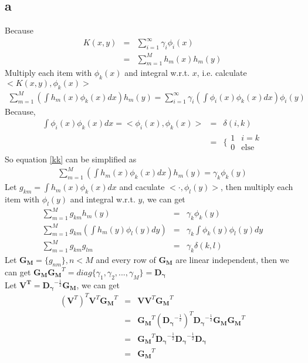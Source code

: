 \documentclass[11pt, oneside]{article}   	%
\begin{document}
\subsection{a}
Because 
\begin{eqnarray}
K(x,y) &=& \sum_{i=1}^{\infty} \gamma_i \phi_i(x)\\
&=& \sum_{m=1}^{M} h_m(x)h_m(y) 
\end{eqnarray}
Multiply each item with $\phi_k(x)$ and integral w.r.t. $x$, i.e. calculate $<K(x, y), \phi_k(x)>$
\begin{eqnarray}\label{kk}
\sum_{m=1}^{M} (\int h_m(x) \phi_k(x)dx) h_m(y) = \sum_{i=1}^{\infty} \gamma_i (\int \phi_i(x) \phi_k(x)dx)\phi_i(y)
\end{eqnarray}
Because, 
\begin{eqnarray}
\int \phi_i(x) \phi_k(x)dx = <\phi_i(x), \phi_k(x)> &=& \delta (i,k)\\
&=& \{ \begin{array}{ll}
 1 & \textrm{$i = k $}\\
 0 & \textrm{else}
  \end{array}
\end{eqnarray}
So equation \ref{kk} can be simplified as 
\begin{eqnarray}
\sum_{m=1}^{M} (\int h_m(x) \phi_k(x)dx) h_m(y) = \gamma_k \phi_k(y)
\end{eqnarray}
Let $g_{km} = \int h_m(x) \phi_k(x)dx$ and caculate $<\cdot, \phi_l(y)>$, then multiply each item with $\phi_l(y)$ and integral w.r.t. $y$, we can get 
\begin{eqnarray}
\label{gkm}
\sum_{m=1}^{M} g_{km} h_m(y) &=& \gamma_k \phi_k(y)\\
\sum_{m=1}^{M} g_{km} (\int h_m(y) \phi_l(y)dy) &=& \gamma_k \int \phi_k(y) \phi_l(y)dy\\
\sum_{m=1}^{M} g_{km} g_{lm} &=& \gamma_k  \delta (k, l)
\end{eqnarray}
Let $\mathbf{G_M} = \{g_{nm}\}, n < M $ and every row of $\mathbf{G_M}$ are linear independent, then we can get $\mathbf{G_M}\mathbf{G_M}^T = diag\{\gamma_1, \gamma_2, ... , \gamma_M\} = \mathbf{D_{\gamma}}$\\
Let $\mathbf{V^T} = \mathbf{D_{\gamma}}^{-\frac{1}{2}} \mathbf{G_M}$, we can get
\begin{eqnarray}
\label{vtv}
(\mathbf{V}^T)^T \mathbf{V}^T  \mathbf{G_M}^T &=& \mathbf{V}\mathbf{V}^T \mathbf{G_M}^T \nonumber \\
&=& \mathbf{G_M}^T (\mathbf{D_{\gamma}}^{-\frac{1}{2}})^T \mathbf{D_{\gamma}}^{-\frac{1}{2}} \mathbf{G_M} \mathbf{G_M}^T \nonumber\\
&=& \mathbf{G_M}^T \mathbf{D_{\gamma}}^{-\frac{1}{2}} \mathbf{D_{\gamma}}^{-\frac{1}{2}} \mathbf{D_{\gamma}}\nonumber\\
&=& \mathbf{G_M}^T
\end{eqnarray}
\end{document}
